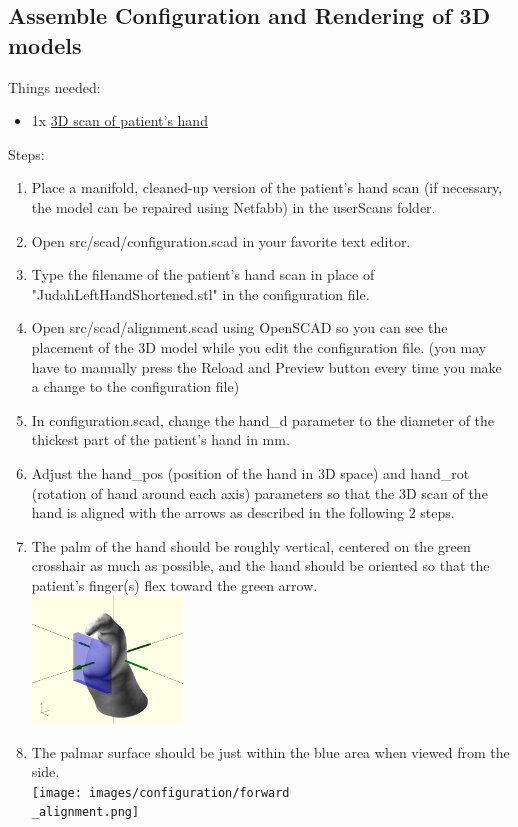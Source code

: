 \documentclass[11pt]{article}
\begin{document}
\subsection{Assemble Configuration and Rendering of 3D models}
Things needed:
\begin{itemize}
\item 1x \hyperlink{thing_hand\_scan}{3D scan of patient's hand}
\end{itemize}
Steps:
\begin{enumerate}
\item Place a manifold, cleaned-up version of the patient's hand scan (if necessary, the model can be repaired using Netfabb) in the userScans folder.
\item Open src/scad/configuration.scad in your favorite text editor.
\item Type the filename of the patient's hand scan in place of "JudahLeftHandShortened.stl" in the configuration file.
\item Open src/scad/alignment.scad using OpenSCAD so you can see the placement of the 3D model while you edit the configuration file. (you may have to manually press the Reload and Preview button every time you make a change to the configuration file)
\item In configuration.scad, change the hand\_d parameter to the diameter of the thickest part of the patient's hand in mm.
\item Adjust the hand\_pos (position of the hand in 3D space) and hand\_rot (rotation of hand around each axis) parameters so that the 3D scan of the hand is aligned with the arrows as described in the following 2 steps.
\item The palm of the hand should be roughly vertical, centered on the green crosshair as much as possible, and the hand should be oriented so that the patient's finger(s) flex toward the green arrow.\\ \includegraphics[width=4cm]{images/configuration/positioning.png}
\item The palmar surface should be just within the blue area when viewed from the side.\\ \texttt{[image: images/configuration/forward\\\_alignment.png]}

\end{enumerate}
\end{document}
